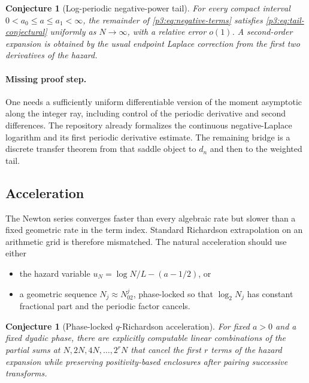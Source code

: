 \documentclass[11pt,oneside]{article}
\newtheorem{conjecture}[theorem]{Conjecture}
\theoremstyle{definition}
\theoremstyle{remark}
\newcommand{\1}{\mathbf 1}
\begin{document}
\begin{conjecture}[Log-periodic negative-power tail]
\label{p3:conj:tail}
For every compact interval $0<a_0\le a\le a_1<\infty$, the remainder of
\eqref{p3:eq:negative-terms} satisfies \eqref{p3:eq:tail-conjectural} uniformly as $N\to\infty$,
with a relative error $o(1)$.  A second-order expansion is obtained by the usual endpoint
Laplace correction from the first two derivatives of the hazard.
\end{conjecture}

\paragraph{Missing proof step.}
One needs a sufficiently uniform differentiable version of the moment asymptotic along the
integer ray, including control of the periodic derivative and second differences.  The
repository already formalizes the continuous negative-Laplace logarithm and its first
periodic derivative estimate.  The remaining bridge is a discrete transfer theorem from
that saddle object to $d_n$ and then to the weighted tail.

\subsection{Acceleration}

The Newton series converges faster than every algebraic rate but slower than a fixed
geometric rate in the term index.  Standard Richardson extrapolation on an arithmetic grid
is therefore mismatched.  The natural acceleration should use either

\begin{itemize}
\item the hazard variable $u_N=\log N/L-(a-1/2)$, or
\item a geometric sequence $N_j\approx N_02^j$, phase-locked so that
      $\log_2N_j$ has constant fractional part and the periodic factor cancels.
\end{itemize}

\begin{conjecture}[Phase-locked $q$-Richardson acceleration]
For fixed $a>0$ and a fixed dyadic phase, there are explicitly computable linear
combinations of the partial sums at $N,2N,4N,\ldots,2^rN$ that cancel the first $r$
terms of the hazard expansion while preserving positivity-based enclosures after pairing
successive transforms.
\end{conjecture}
\end{document}
